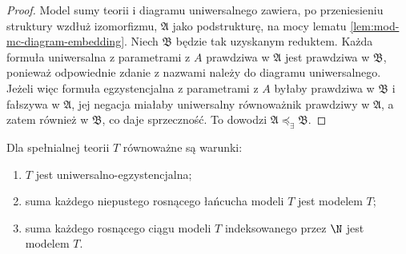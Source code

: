\begin{proof}
Model sumy teorii i diagramu uniwersalnego zawiera,
po przeniesieniu struktury wzdłuż izomorfizmu,
$\mathfrak A$ jako podstrukturę, na mocy lematu
\ref{lem:mod-mc-diagram-embedding}.
Niech $\mathfrak B$ będzie tak uzyskanym reduktem.
Każda formuła uniwersalna z parametrami z $A$
prawdziwa w $\mathfrak A$ jest prawdziwa w $\mathfrak B$,
ponieważ odpowiednie zdanie z nazwami należy
do diagramu uniwersalnego. Jeżeli więc formuła
egzystencjalna z parametrami z $A$ byłaby prawdziwa
w $\mathfrak B$ i fałszywa w $\mathfrak A$, jej
negacja miałaby uniwersalny równoważnik prawdziwy
w $\mathfrak A$, a zatem również w $\mathfrak B$,
co daje sprzeczność. To dowodzi
$\mathfrak A\preccurlyeq_{\exists}\mathfrak B$.
\end{proof}

\begin{twierdzenie}
\label{thm:mod-mc-inductive}
Dla spełnialnej teorii $T$ równoważne są warunki:
\begin{enumerate}[label=(\roman*)]
\item $T$ jest uniwersalno-egzystencjalna;
\item suma każdego niepustego rosnącego łańcucha
modeli $T$ jest modelem $T$;
\item suma każdego rosnącego ciągu modeli $T$
indeksowanego przez $\N$ jest modelem $T$.
\end{enumerate}
\end{twierdzenie}
